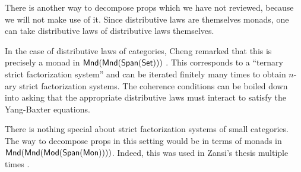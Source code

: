 \begin{aside}
There is another way to decompose props which we have not reviewed, because we will not make use of it.    Since distributive laws are themselves monads, one can take distributive laws of distributive laws themselves. 


In the case of distributive laws of categories, Cheng remarked that this is precisely a monad in ${\sf Mnd}({\sf Mnd}(\mathsf{Span}(\mathsf{Set})))$ \cite{iterdist}.  This corresponds to a ``ternary strict factorization system'' and can be iterated finitely many times to obtain $n$-ary strict factorization systems. The coherence conditions can be boiled down into asking that the appropriate distributive laws must interact to satisfy the Yang-Baxter equations.

There is nothing special about strict factorization systems of small categories.  The way to decompose props in this setting would be in terms of monads in\\ ${\sf Mnd}({\sf Mnd}({\sf Mod}(\mathsf{Span}({\sf Mon}))))$.  Indeed, this was used in Zansi's thesis multiple times \cite[Proposition 3.3., Example 2.34]{ih}.
\end{aside}
%
%
%
%


